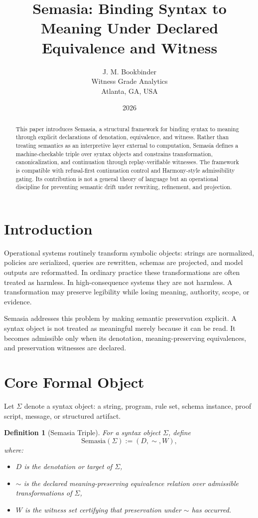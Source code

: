 \documentclass[11pt]{article}
\title{Semasia: Binding Syntax to Meaning Under Declared Equivalence and Witness}
\author{J. M. Bookbinder \\ Witness Grade Analytics \\ Atlanta, GA, USA}
\date{2026}
\newtheorem{definition}{Definition}
\begin{document}
\maketitle

\begin{abstract}
This paper introduces Semasia, a structural framework for binding syntax to meaning through explicit declarations of denotation, equivalence, and witness. Rather than treating semantics as an interpretive layer external to computation, Semasia defines a machine-checkable triple over syntax objects and constrains transformation, canonicalization, and continuation through replay-verifiable witnesses. The framework is compatible with refusal-first continuation control and Harmony-style admissibility gating. Its contribution is not a general theory of language but an operational discipline for preventing semantic drift under rewriting, refinement, and projection.
\end{abstract}

\section{Introduction}

Operational systems routinely transform symbolic objects: strings are normalized, policies are serialized, queries are rewritten, schemas are projected, and model outputs are reformatted. In ordinary practice these transformations are often treated as harmless. In high-consequence systems they are not harmless. A transformation may preserve legibility while losing meaning, authority, scope, or evidence.

Semasia addresses this problem by making semantic preservation explicit. A syntax object is not treated as meaningful merely because it can be read. It becomes admissible only when its denotation, meaning-preserving equivalences, and preservation witnesses are declared.

\section{Core Formal Object}

Let $\Sigma$ denote a syntax object: a string, program, rule set, schema instance, proof script, message, or structured artifact.

\begin{definition}[Semasia Triple]
For a syntax object $\Sigma$, define
\[
\mathrm{Semasia}(\Sigma) := (D,\sim,W),
\]
where:
\begin{itemize}[leftmargin=2em]
\item $D$ is the denotation or target of $\Sigma$,
\item $\sim$ is the declared meaning-preserving equivalence relation over admissible transformations of $\Sigma$,
\item $W$ is the witness set certifying that preservation under $\sim$ has occurred.
\end{itemize}
\end{definition}
\end{document}
